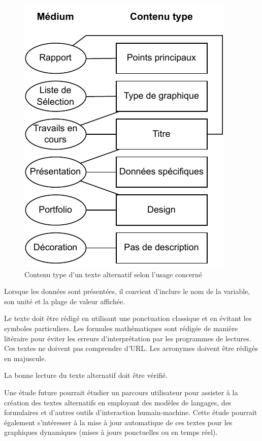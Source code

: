 \documentclass[a4paper,12pt]{article}
\begin{document}
\begin{multicols}{2}
\begin{figure}[H]
\centering
\includegraphics[width=.9\linewidth]{./img/alt-text.pdf}
\caption{\label{fig:alt-txt}Contenu type d'un texte alternatif selon l'usage concerné}
\end{figure}

Lorsque les données sont présentées, il convient d'inclure le nom de la variable, son unité et la plage de valeur affichée.

Le texte doit être rédigé en utilisant une ponctuation classique et en évitant les symboles particuliers. Les formules mathématiques sont rédigée de manière litéraire pour éviter les erreurs d'interprétation par les programmes de lectures. Ces textes ne doivent pas comprendre d'URL. Les acronymes doivent être rédigés en majuscule.

La bonne lecture du texte alternatif doit être vérifié.

Une étude future pourrait étudier un parcours utilisateur pour assister à la création des textes alternatifs en employant des modèles de langages, des formulaires et d'autres outils d'interaction humain-machine. Cette étude pourrait également s'intéresser à la mise à jour automatique de ces textes pour les graphiques dynamiques  (mises à jours ponctuelles ou en temps réel).

\end{multicols}
\end{document}
